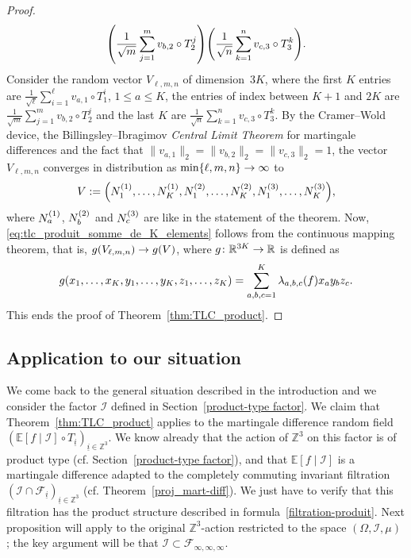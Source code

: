 \documentclass[AHL,Unicode,longabstracts,published]{cedram}
\newcommand{\Z}{\mathbb{Z}}
\newcommand*\R{\mathbb{R}}
\newcommand{\bbE}{\mathbb{E}}
\newcommand*\I{\mathcal{I}}
\newcommand*\F{\mathcal{F}}
\newcommand{\pr}[1]{\left(#1\right)}
\renewcommand*{\to}{\mathchoice{\longrightarrow}{\rightarrow}{\rightarrow}{\rightarrow}}
\let\originalleft\left
\let\originalright\right
\renewcommand{\left}{\mathopen{}\mathclose\bgroup\originalleft}
\renewcommand{\right}{\aftergroup\egroup\originalright}
\begin{document}
\begin{proof}
\begin{multline*}
\pr{\frac 1{\sqrt{m}}\sum_{j=1}^m v_{b,2}\circ T_2^j}
\pr{\frac 1{\sqrt{n}}\sum_{k=1}^n v_{c,3}\circ T_3^k}.
\end{multline*}
Consider the random vector $V_{\ell,m,n}$ of dimension~$3K$, where the first $K$ entries are $\frac 1{\sqrt{\ell}}\sum_{i=1}^\ell v_{a,1}\circ T_1^i$, $1\leq a\leq K$, the entries of index between $K+1$ and $2K$ are $\frac 1{\sqrt{m}}\sum_{j=1}^m v_{b,2}\circ T_2^j$ and the last $K$ are $\frac 1{\sqrt{n}}\sum_{k=1}^n v_{c,3}\circ T_3^k$. By the Cramer--Wold device, the Billingsley--Ibragimov \emph{Central Limit Theorem} for martingale differences and the fact that $\|v_{a,1}\|_2=\|v_{b,2}\|_2=\|v_{c,3}\|_2=1$, the vector $V_{\ell,m,n}$ converges in distribution as
$\min\{\ell,m,n\}\to\infty$ to
\[
V:=\pr{N_1^{\pr{1}},\dots,N_K^{\pr{1}},
N_1^{\pr{2}},\dots,N_K^{\pr{2}},N_1^{\pr{3}},\dots,N_K^{\pr{3}}},
\]
where $N_a^{\pr{1}}$, $N_b^{\pr{2}}$ and $N_c^{\pr{3}}$ are like in the statement of the theorem. Now, \eqref{eq:tlc_produit_somme_de_K_elements} follows from the continuous mapping theorem, that is, $g(V_{\ell,m,n})\to g\pr{V}$, where $g\colon \R^{3K}\to \R$ is defined as
\begin{equation*}
g\pr{x_1,\dots,x_K,y_1,\dots,y_K,z_1,\dots,z_K} =\sum_{a,b,c=1}^K\lambda_{a,b,c}\pr{f} x_ay_bz_c.
\end{equation*}
This ends the proof of Theorem~\ref{thm:TLC_product}.
\end{proof}

\subsection{Application to our situation} \label{appli_to_I}
We come back to the general situation described in the introduction and we consider the factor $\I$ defined in Section~\ref{product-type factor}. We claim that Theorem~\ref{thm:TLC_product} applies to the martingale difference random field $(\bbE[f\mid\I]\circ T_{\underline{i}})_{\underline{i}\in\Z^3}$. We know already that the action of $\Z^3$ on this factor is of product type (cf. Section~\ref{product-type factor}), and that $\bbE[f\mid\I]$ is a martingale difference adapted to the completely commuting invariant filtration $(\I\cap\F_{\underline{i}})_{\underline{i}\in\Z^3}$ (cf. Theorem~\ref{proj_mart-diff}). We just have to verify that this filtration has the product structure described in formula~\eqref{filtration-produit}. Next proposition will apply to the original $\Z^3$-action restricted to the space $(\Omega,\I,\mu)$ ; the key argument will be that $\I\subset\F_{\infty,\infty,\infty}$.
\end{document}
